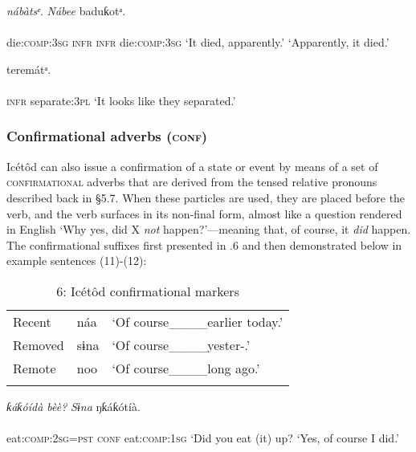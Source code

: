 \ea\label{ex:}
     \textit{nábàtsᵉ}.  \textit{Nábee}    baduƙotᵃ. \\
    \\
die:\textsc{comp:3sg   infr}    \textsc{infr}     die:\textsc{comp:3sg}
\glt ‘It died, apparently.’    ‘Apparently, it died.’ 
\z




\ea\label{ex:}
   teremátᵃ. \\
    \\
\textsc{infr}     separate:\textsc{3pl}
\glt ‘It looks like they separated.’ 
\z




\subsubsection{Confirmational adverbs (\textsc{conf})}

Icétôd can also issue a confirmation of a state or event by means of a set of \textsc{confirmational} adverbs that are derived from the tensed relative pronouns described back in §5.7. When these particles are used, they are placed before the verb, and the verb surfaces in its non-final form, almost like a question rendered in English ‘Why yes, did X \textit{not} happen?’—meaning that, of course, it \textit{did} happen. The confirmational suffixes first presented in .6 and then demonstrated below in example sentences (11)-(12):


\begin{table}
\caption{6: Icétôd confirmational markers}
\label{tab:9}


\begin{tabularx}{\textwidth}{XXX}
\lsptoprule

Recent & náa & ‘Of course\_\_\_\_earlier today.’\\
Removed & sɨna & ‘Of course\_\_\_\_yester-.’\\
Remote & noo & ‘Of course\_\_\_\_long ago.’\\
\lspbottomrule
\end{tabularx}
\end{table}



\ea\label{ex:}
\textit{ƙáƙóídà bèè?}    \textit{Sɨna}   ŋƙáƙótíà. \\
    \\
eat:\textsc{comp:2sg=pst}    \textsc{conf}   eat\textsc{:comp:1sg}
\glt ‘Did you eat (it) up?  ‘Yes, of course I did.’ 
\z




